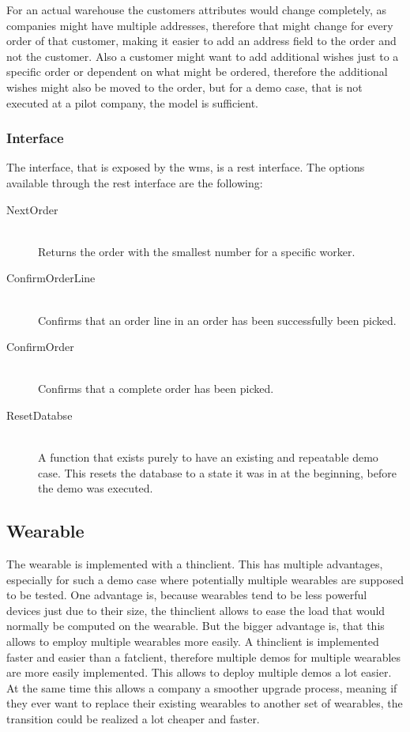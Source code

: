 For an actual warehouse the customers attributes would change completely, as companies might have multiple addresses, therefore that might change for every order of that customer, making it easier to add an address field to the order and not the customer.  Also a customer might want to add additional wishes just to a specific order or dependent on what might be ordered, therefore the additional wishes might also be moved to the order, but for a demo case, that is not executed at a pilot company, the model is sufficient.

\subsubsection{Interface}
The interface, that is exposed by the \gls{wms}, is a \gls{rest} interface. The options available through the \gls{rest} interface are the following:
\begin{description}
	\item[NextOrder] \hfill \\
	Returns the order with the smallest number for a specific worker.
	\item[ConfirmOrderLine] \hfill \\
	Confirms that an order line in an order has been successfully been picked.
	\item[ConfirmOrder] \hfill \\
	Confirms that a complete order has been picked.
	\item[ResetDatabse] \hfill \\
	A function that exists purely to have an existing and repeatable demo case. This resets the database to a state it was in at the beginning, before the demo was executed.
\end{description}

\subsection{Wearable}
The wearable is implemented with a \gls{thinclient}. This has multiple advantages, especially for such a demo case where potentially multiple wearables are supposed to be tested. One advantage is, because wearables tend to be less powerful devices just due to their size, the \gls{thinclient} allows to ease the load that would normally be computed on the wearable. But the bigger advantage is, that this allows to employ multiple wearables more easily. A \gls{thinclient} is implemented faster and easier than a \gls{fatclient}, therefore multiple demos for multiple wearables are more easily implemented. This allows to deploy multiple demos a lot easier. At the same time this allows a company a smoother upgrade process, meaning if they ever want to replace their existing wearables to another set of wearables, the transition could be realized a lot cheaper and faster.

